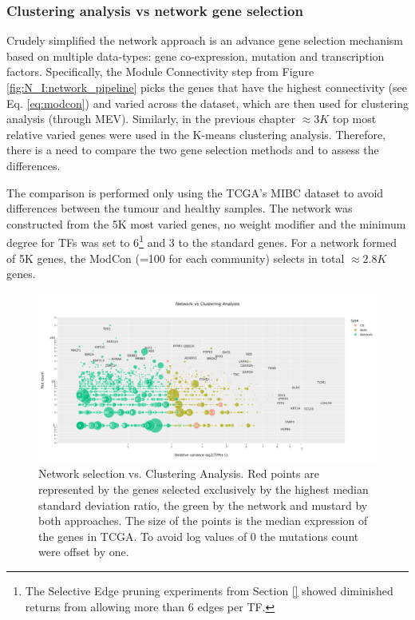 \subsubsection{Clustering analysis vs network gene selection} \label{s:N_I:cs_vs_gene_sel}

Crudely simplified the network approach is an advance gene selection mechanism based on multiple data-types: gene co-expression, mutation and transcription factors. Specifically, the Module Connectivity step from Figure \ref{fig:N_I:network_pipeline} picks the genes that have the highest connectivity (see Eq. \ref{eq:modcon}) and varied across the dataset, which are then used for clustering analysis (through MEV). Similarly, in the previous chapter $\approx3K$ top most relative varied genes were used in the K-means clustering analysis. Therefore, there is a need to compare the two gene selection methods and to assess the differences.

The comparison is performed only using the TCGA's MIBC dataset to avoid differences between the tumour and healthy samples. The network was constructed from the 5K most varied genes, no weight modifier and the minimum degree for TFs  was set to 6\footnote{The Selective Edge pruning experiments from Section \ref{} showed diminished returns from allowing more than 6 edges per TF.} and 3 to the standard genes. For a network formed of 5K genes, the ModCon (=100 for each community) selects in total $\approx2.8K$ genes.


\begin{figure}[!t]    \centering\includegraphics[width=1.0\textwidth,height=0.7\textheight,keepaspectratio]{Sections/Network_I/Resources/Tum_network/ClusteringAnalysis_vs_Network_3.png}
    \caption{Network selection vs. Clustering Analysis. Red points are represented by the genes selected exclusively by the highest median standard deviation ratio, the green by the network and mustard by both approaches. The size of the points is the median expression of the genes in TCGA. To avoid log values of 0 the mutations count were offset by one.}
    \label{fig:N_I:network_ca_selection}
\end{figure}


